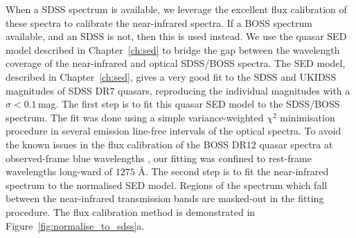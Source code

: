 When a SDSS spectrum is available, we leverage the excellent flux calibration of these spectra to calibrate the near-infrared spectra. 
If a BOSS spectrum available, and an SDSS is not, then this is used instead. 
We use the quasar SED model described in Chapter~\ref{ch:sed} to bridge the gap between the wavelength coverage of the near-infrared and optical SDSS/BOSS spectra.
The SED model, described in Chapter~\ref{ch:sed}, gives a very good fit to the SDSS and UKIDSS magnitudes of SDSS DR$7$ quasars, reproducing the individual magnitudes with a $\sigma <0.1$\,mag.
The first step is to fit this quasar SED model to the SDSS/BOSS spectrum. 
The fit was done using a simple variance-weighted $\chi^2$ minimisation procedure in several emission line-free intervals of the optical spectra.   
To avoid the known issues in the flux calibration of the BOSS DR$12$ quasar spectra at observed-frame blue wavelengths \citep{lee13}, our fitting was confined to rest-frame wavelengths long-ward of $1275$ \AA. 
The second step is to fit the near-infrared spectrum to the normalised SED model. 
Regions of the spectrum which fall between the near-infrared transmission bands are masked-out in the fitting procedure. 
The flux calibration method is demonstrated in Figure~\ref{fig:normalise_to_sdss}a. 

